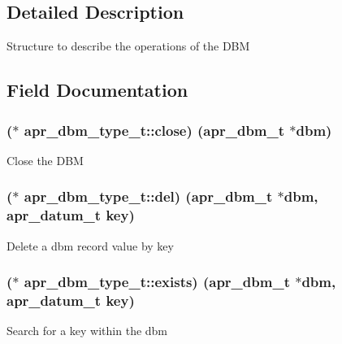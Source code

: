 \subsection{Detailed Description}
Structure to describe the operations of the D\+BM 

\subsection{Field Documentation}
\subsubsection[{\texorpdfstring{close}{close}}]{($\ast$ apr\+\_\+dbm\+\_\+type\+\_\+t\+::close) ({\bf apr\+\_\+dbm\+\_\+t} $\ast$dbm)}\hypertarget{structapr__dbm__type__t_ad279fc2ecb08cb1c8b4dc93feacb8491}{}\label{structapr__dbm__type__t_ad279fc2ecb08cb1c8b4dc93feacb8491}
Close the D\+BM 
\subsubsection[{\texorpdfstring{del}{del}}]{($\ast$ apr\+\_\+dbm\+\_\+type\+\_\+t\+::del) ({\bf apr\+\_\+dbm\+\_\+t} $\ast$dbm, {\bf apr\+\_\+datum\+\_\+t} {\bf key})}\hypertarget{structapr__dbm__type__t_a513136c6a4e645f7524742d240f6e400}{}\label{structapr__dbm__type__t_a513136c6a4e645f7524742d240f6e400}
Delete a dbm record value by key 
\subsubsection[{\texorpdfstring{exists}{exists}}]{($\ast$ apr\+\_\+dbm\+\_\+type\+\_\+t\+::exists) ({\bf apr\+\_\+dbm\+\_\+t} $\ast$dbm, {\bf apr\+\_\+datum\+\_\+t} {\bf key})}\hypertarget{structapr__dbm__type__t_ab3192948d859017eec8c350d55f8aa72}{}\label{structapr__dbm__type__t_ab3192948d859017eec8c350d55f8aa72}
Search for a key within the dbm 
